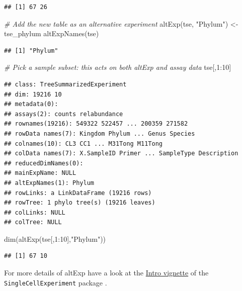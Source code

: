 \documentclass[
]{book}
\newenvironment{Shaded}{\begin{snugshade}}{\end{snugshade}}
\newcommand{\CommentTok}[1]{\textcolor[rgb]{0.56,0.35,0.01}{\textit{#1}}}
\newcommand{\DecValTok}[1]{\textcolor[rgb]{0.00,0.00,0.81}{#1}}
\newcommand{\FunctionTok}[1]{\textcolor[rgb]{0.00,0.00,0.00}{#1}}
\newcommand{\NormalTok}[1]{#1}
\newcommand{\OtherTok}[1]{\textcolor[rgb]{0.56,0.35,0.01}{#1}}
\newcommand{\SpecialCharTok}[1]{\textcolor[rgb]{0.00,0.00,0.00}{#1}}
\newcommand{\StringTok}[1]{\textcolor[rgb]{0.31,0.60,0.02}{#1}}
\begin{document}
\begin{verbatim}
## [1] 67 26
\end{verbatim}

\begin{Shaded}
\begin{Highlighting}[]
\CommentTok{\# Add the new table as an alternative experiment}
\FunctionTok{altExp}\NormalTok{(tse, }\StringTok{"Phylum"}\NormalTok{) }\OtherTok{\textless{}{-}}\NormalTok{ tse\_phylum}
\FunctionTok{altExpNames}\NormalTok{(tse)}
\end{Highlighting}
\end{Shaded}

\begin{verbatim}
## [1] "Phylum"
\end{verbatim}

\begin{Shaded}
\begin{Highlighting}[]
\CommentTok{\# Pick a sample subset: this acts on both altExp and assay data}
\NormalTok{tse[,}\DecValTok{1}\SpecialCharTok{:}\DecValTok{10}\NormalTok{]}
\end{Highlighting}
\end{Shaded}

\begin{verbatim}
## class: TreeSummarizedExperiment 
## dim: 19216 10 
## metadata(0):
## assays(2): counts relabundance
## rownames(19216): 549322 522457 ... 200359 271582
## rowData names(7): Kingdom Phylum ... Genus Species
## colnames(10): CL3 CC1 ... M31Tong M11Tong
## colData names(7): X.SampleID Primer ... SampleType Description
## reducedDimNames(0):
## mainExpName: NULL
## altExpNames(1): Phylum
## rowLinks: a LinkDataFrame (19216 rows)
## rowTree: 1 phylo tree(s) (19216 leaves)
## colLinks: NULL
## colTree: NULL
\end{verbatim}

\begin{Shaded}
\begin{Highlighting}[]
\FunctionTok{dim}\NormalTok{(}\FunctionTok{altExp}\NormalTok{(tse[,}\DecValTok{1}\SpecialCharTok{:}\DecValTok{10}\NormalTok{],}\StringTok{"Phylum"}\NormalTok{))}
\end{Highlighting}
\end{Shaded}

\begin{verbatim}
## [1] 67 10
\end{verbatim}

For more details of altExp have a look at the \href{https://bioconductor.org/packages/release/bioc/vignettes/SingleCellExperiment/inst/doc/intro.html}{Intro vignette} of the
\texttt{SingleCellExperiment} package \citep{R_SingleCellExperiment}.
\end{document}
